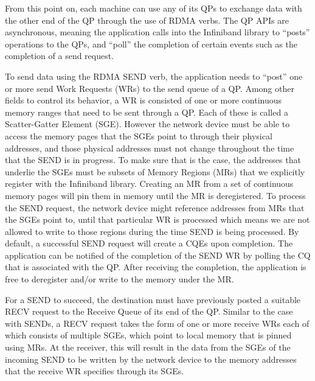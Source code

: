 From this point on, each machine can use any of its QPs to exchange data with
the other end of the QP through the use of RDMA verbs. The QP APIs are
asynchronous, meaning the application calls into the Infiniband library to
``posts'' operations to the QPs, and ``poll'' the completion of certain events
such as the completion of a send request.

To send data using the RDMA SEND verb, the application needs to ``post'' one
or more send Work Requests (WRs) to the send queue of a QP. Among other fields
to control its behavior, a WR is consisted of one or more
continuous memory ranges that need to be sent through a QP. Each of these
is called a Scatter-Gatter Element (SGE). However the network device must be
able to access the memory pages that the SGEs point to through their physical
addresses, and those physical addresses must not change throughout the time
that the SEND is in progress. To make sure that is the case, the addresses
that underlie the SGEs must be subsets of Memory Regions (MRs) that we
explicitly register with the Infiniband library. Creating an MR from a set of
continuous memory pages will pin them in memory until the MR is
deregistered. To process the SEND request, the network device might reference
addresses from MRs that the SGEs point to, until that particular WR is
processed which means we are not allowed to write to those regions during
the time SEND is being processed. By default, a successful SEND request will
create a CQEs upon completion. The application can be notified of the completion
of the SEND WR by polling the CQ that is associated with the QP. After receiving
the completion, the application is free to deregister and/or write to the
memory under the MR.

For a SEND to succeed, the destination must have previously posted a suitable
RECV request to the Receive Queue of its end of the QP. Similar to the case with SENDs,
a RECV request takes the form of one or more receive WRs each of which
consists of multiple SGEs, which point to local memory that is pinned using
MRs. At the receiver, this will result in the data from the SGEs of the incoming
SEND to be written by the network device to the memory addresses that the
receive WR specifies through its SGEs.

